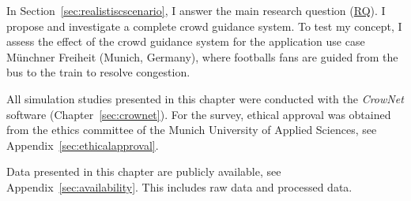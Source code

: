 In Section~\ref{sec:realistiscscenario}, I answer the main research question (\hyperref[reserachquestions]{RQ}). I propose and investigate a complete crowd guidance system. To test my concept, I assess the effect of the crowd guidance system for the application use case Münchner Freiheit (Munich, Germany), where footballs fans are guided from the bus to the train to resolve congestion. 



All simulation studies presented in this chapter were conducted with the \textit{CrowNet} software (Chapter~\ref{sec:crownet}). For the survey, ethical approval was obtained from the ethics committee of the Munich University of Applied Sciences, see Appendix~\ref{sec:ethicalapproval}.

\begin{tcolorbox}[float,floatplacement=hbt!,title=Availability of data]
Data presented in this chapter are publicly available, see Appendix~\ref{sec:availability}. This includes raw data and processed data.
\end{tcolorbox}



